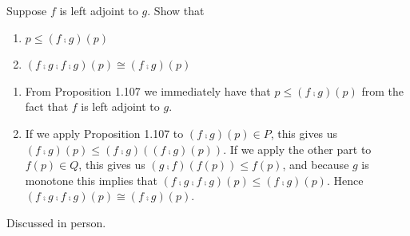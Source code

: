 Suppose $f$ is left adjoint to $g$.  Show that
\begin{enumerate}
	\item $p\leq (f\fcmp g)(p)$
	\item $(f \fcmp g\fcmp f \fcmp g)(p)\cong (f\fcmp g)(p)$
\end{enumerate}

\solution
\begin{enumerate}
	\item From Proposition 1.107 we immediately have that $p\leq (f\fcmp g)(p)$ from the fact that $f$ is left adjoint to $g$.
	\item If we apply Proposition 1.107 to $(f\fcmp g)(p)\in P$, this gives us $(f\fcmp g)(p)\leq (f\fcmp g)((f\fcmp g)(p))$.  If we apply the other part to $f(p)\in Q$, this gives us $(g\fcmp f)(f(p))\leq f(p)$, and because $g$ is monotone this implies that $(f\fcmp g\fcmp f\fcmp g)(p) \leq (f\fcmp g)(p)$.  Hence $(f \fcmp g\fcmp f \fcmp g)(p)\cong (f\fcmp g)(p)$.
\end{enumerate}

Discussed in person.
